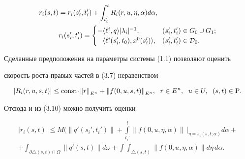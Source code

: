 \begin{equation}


\begin{split}


r_{i}(s,t) &= r_{i}(s_{i}',t_{i}') +


\int_{t_{i}'}^{t} R_{i}(r,u,\eta,\alpha) d\alpha, \\


&


r_{i}(s_{i}',t_{i}') =


\begin{cases}


- \la \ell^{i}, q \ra | \lambda_{i} |^{-1}, &


(s_{i}',t_{i}')\in G_{0} \cup G_{1}; \\


\phantom{-}\la \ell^{i}(s_{i}',t_{0}), x^{0}(s_{i}') \ra, &


(s_{i}',t_{i}') \in {\cal D}_{0}. 


\end{cases}


\end{split}


\end{equation}





Сделанные предположения на параметры системы (1.1) позволяют оценить


скорость роста правых частей в (3.7) неравенством


$$


| R_i (r,u,s,t) | \leq \const \cdot {\| r \|}_{E^n} +


{\| f(0,u,s,t) \|}_{E^n},\ \; r \in E^n,\ \; u \in U,\ \; (s,t) \in {\P}.


$$


Отсюда и из (3.10) можно получить оценки


\begin{multline}


| r_i (s,t) | \leq


M \bigg( \| q' (s_{i}',t_{i}') \| +


\int\limits_{t_{i}'}^{t} \| f(0,u,\eta,\alpha) \|\,


\Big|_{\eta = s_{i}(s,t; \alpha)} d\alpha + \\


%


+ \int_{\partial \triangle (s,t) \cap \Omega}


\| q' (s,t) \| d\omega +


\int \int_{\triangle(s,t)} \| f(0,u,\eta,\alpha) \| d\eta\,d\alpha.


\end{multline}


